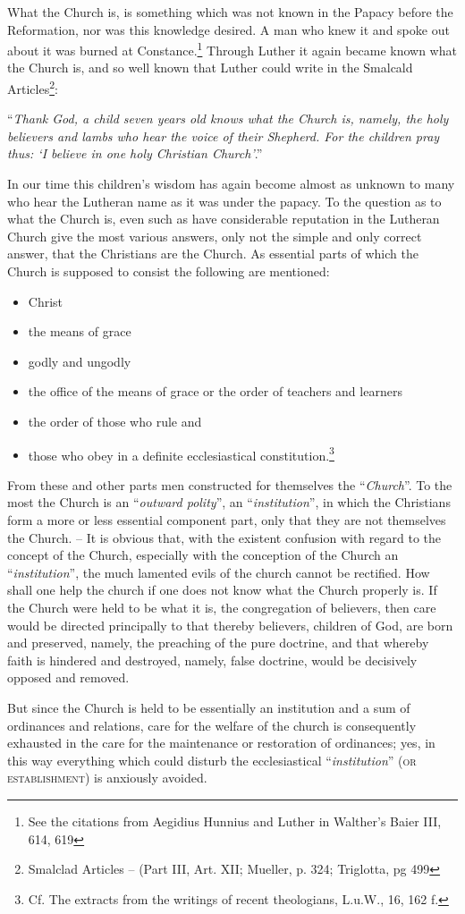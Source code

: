                 What the Church is, is something which was not known in the Papacy before the Reformation, nor was this knowledge desired.  A man who knew it and spoke out about it was burned at Constance.\footnote{See the citations from Aegidius Hunnius and Luther in Walther’s Baier III, 614, 619}  Through Luther it again became known what the Church is, and so well known that Luther could write in the Smalcald Articles\footnote{Smalclad Articles -- (Part III, Art. XII; Mueller, p. 324; Triglotta, pg 499}: \begin{displayquote}“\textit{Thank God, a child seven years old knows what the Church is, namely, the holy believers and lambs who hear the voice of their Shepherd.  For the children pray thus: ‘{\small I believe in one holy Christian Church}’}.”\end{displayquote}  In our time this children’s wisdom has again become almost as unknown to many who hear the Lutheran name as it was under the papacy.  To the question as to what the Church is, even such as have considerable reputation in the Lutheran Church give the most various answers, only not the simple and only correct answer, that the Christians are the Church. As essential parts of which the Church is supposed to consist the following are mentioned: \begin{itemize} \item Christ \item the means of grace \item godly and ungodly \item the office of the means of grace or  the order of teachers and learners \item the order of those who rule and \item those who obey in a definite ecclesiastical constitution.\footnote{Cf. The extracts from the writings of recent theologians, L.u.W., 16, 162 f.}\end{itemize}
                From these and other parts men constructed for themselves the “\textit{Church}”. To the most the Church is an “\textit{outward polity}”, an “\textit{institution}”, in which the Christians form a more or less essential component part, only that they are not themselves the Church. --  It is obvious that, with the existent confusion with regard to the concept of the Church, especially with the conception of the Church an “\textit{institution}”, the much lamented evils of the church cannot be rectified.  How shall one help the church if one does not know what the Church properly is.  If the Church were held to be what it is, the congregation of believers, then care would be directed principally to that thereby believers, children of God, are born and preserved, namely, the preaching of the pure doctrine, and that whereby faith is hindered and destroyed, namely, false doctrine, would be decisively opposed and removed.  \par But since the Church is held to be essentially an institution and a sum of ordinances and relations, care for the welfare of the church is consequently exhausted in the care for the maintenance or restoration of ordinances; yes, in this way everything which could disturb the ecclesiastical “\textit{institution}” {\scriptsize\textsc{(or establishment)}} is anxiously avoided.

